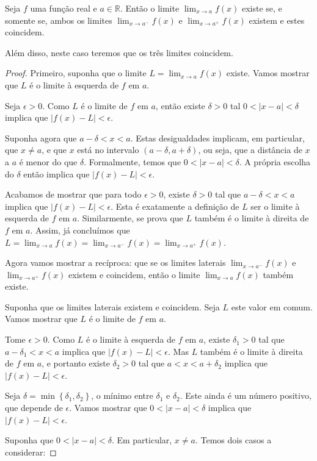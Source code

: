 \begin{theorem}
	Seja $f$ uma função real e $a\in\mathbb{R}$. Então o limite $\lim_{x\to a}f(x)$ existe se, e somente se, ambos os limites $\lim_{x\to a^-}f(x)$ e $\lim_{x\to a^+}f(x)$ existem e estes coincidem.
	
	Além disso, neste caso teremos que os três limites coincidem.
\end{theorem}

\begin{proof}
	Primeiro, suponha que o limite $L=\lim_{x\to a}f(x)$ existe. Vamos mostrar que $L$ é o limite à esquerda de $f$ em $a$.
	
	Seja $\epsilon>0$. Como $L$ é o limite de $f$ em $a$, então existe $\delta>0$ tal $0<|x-a|<\delta$ implica que $|f(x)-L|<\epsilon$.
	
	Suponha agora que $a-\delta<x<a$. Estas desigualdades implicam, em particular, que $x\neq a$, e que $x$ está no intervalo $(a-\delta,a+\delta)$, ou seja, que a distância de $x$ a $a$ é menor do que $\delta$. Formalmente, temos que $0<|x-a|<\delta$. A própria escolha do $\delta$ então implica que $|f(x)-L|<\epsilon$.
	
	Acabamos de mostrar que para todo $\epsilon>0$, existe $\delta>0$ tal que $a-\delta<x<a$ implica que $|f(x)-L|<\epsilon$. Esta é exatamente a definição de $L$ ser o limite à esquerda de $f$ em $a$. Similarmente, se prova que $L$ também é o limite à direita de $f$ em $a$. Assim, já concluímos que $L=\lim_{x\to a}f(x)=\lim_{x\to a^-}f(x)=\lim_{x\to a^+}f(x)$.
	
	Agora vamos mostrar a recíproca: que se os limites laterais $\lim_{x\to a^-}f(x)$ e $\lim_{x\to a^+}f(x)$ existem e coincidem, então o limite $\lim_{x\to a}f(x)$ também existe.
	
	Suponha que os limites laterais existem e coincidem. Seja $L$ este valor em comum. Vamos mostrar que $L$ é o limite de $f$ em $a$.
	
	Tome $\epsilon>0$. Como $L$ é o limite à esquerda de $f$ em $a$, existe $\delta_1>0$ tal que $a-\delta_1<x<a$ implica que $|f(x)-L|<\epsilon$. Mas $L$ também é o limite à direita de $f$ em $a$, e portanto existe $\delta_2>0$ tal que $a<x<a+\delta_2$ implica que $|f(x)-L|<\epsilon$.
	
	Seja $\delta=\min\left\{\delta_1,\delta_2\right\}$, o mínimo entre $\delta_1$ e $\delta_2$. Este ainda é um número positivo, que depende de $\epsilon$. Vamos mostrar que $0<|x-a|<\delta$ implica que $|f(x)-L|<\epsilon$.
	
	Suponha que $0<|x-a|<\delta$. Em particular, $x\neq a$. Temos dois casos a considerar:
	

\end{proof}
